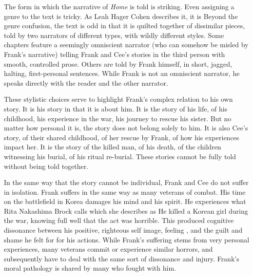 \documentclass[12pt]{article}
\begin{document}
The form in which the narrative of \emph{Home} is told is striking. Even
assigning a genre to the text is tricky. As Leah Hager Cohen describes it, it
is \autocite{HagerCohen12} Beyond the genre
confusion, the text is odd in that it is quilted together of dissimilar pieces,
told by two narrators of different types, with wildly different styles. Some
chapters feature a seemingly omniscient narrator (who can somehow be misled by
Frank's narrative) telling Frank and Cee's stories in the third person with
smooth, controlled prose. Others are told by Frank himself, in short, jagged,
halting, first-personal sentences. While Frank is not an omniscient narrator,
he speaks directly with the reader and the other narrator.

These stylistic choices serve to highlight Frank's complex relation to his own
story. It is his story in that it is about him. It is the story of his life, of
his childhood, his experience in the war, his journey to rescue his sister. But
no matter how personal it is, the story does not belong solely to him. It is
also Cee's story, of their shared childhood, of her rescue by Frank, of how his
experiences impact her. It is the story of the killed man, of his death, of the
children witnessing his burial, of his ritual re-burial. These stories cannot
be fully told without being told together.

In the same way that the story cannot be individual, Frank and Cee do not
suffer in isolation. Frank suffers in the same way as many veterans of combat.
His time on the battlefield in Korea damages his mind and his spirit. He
experiences what Rita Nakashima Brock calls  which she
describes as \autocite{Brock15}
He killed a Korean girl during the war, knowing full well that the act was
horrible. This produced cognitive dissonance between his positive, righteous
self image, feeling ,\autocite[p. 133]{Morrison12} and the guilt and shame he felt for for his
actions. While Frank's suffering stems from very personal experiences, many
veterans commit or experience similar horrors, and subsequently have to deal
with the same sort of dissonance and injury. Frank's moral pathology is shared
by many who fought with him.
\end{document}
